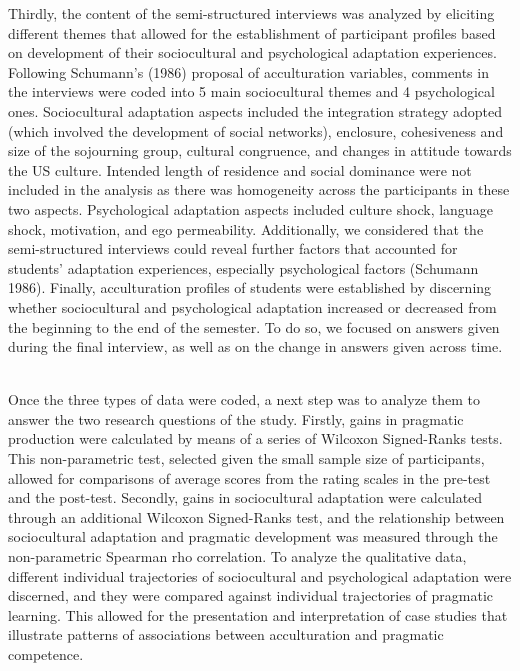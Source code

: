\documentclass[12pt]{article}
\newenvironment{styleStandard}{\setlength\leftskip{0cm}\setlength\rightskip{0cm plus 1fil}\setlength\parindent{0cm}\setlength\parfillskip{0pt plus 1fil}\setlength\parskip{0in plus 1pt}\writerlistparindent\writerlistleftskip\leavevmode\normalfont\normalsize\writerlistlabel\ignorespaces}{\unskip\vspace{0.111in plus 0.0111in}\par}
\newcommand\writerlistleftskip{}
\newcommand\writerlistparindent{}
\newcommand\writerlistlabel{}
\begin{document}
\begin{styleStandard}
Thirdly, the content of the semi-structured interviews was analyzed by eliciting different themes that allowed for the establishment of participant profiles based on development of their sociocultural and psychological adaptation experiences. Following Schumann’s (1986) proposal of acculturation variables, comments in the interviews were coded into 5 main sociocultural themes and 4 psychological ones. Sociocultural adaptation aspects included the integration strategy adopted (which involved the development of social networks), enclosure, cohesiveness and size of the sojourning group, cultural congruence, and changes in attitude towards the US culture. Intended length of residence and social dominance were not included in the analysis as there was homogeneity across the participants in these two aspects. Psychological adaptation aspects included culture shock, language shock, motivation, and ego permeability. Additionally, we considered that the semi-structured interviews could reveal further factors that accounted for students’ adaptation experiences, especially psychological factors (Schumann 1986). Finally, acculturation profiles of students were established by discerning whether sociocultural and psychological adaptation increased or decreased from the beginning to the end of the semester. To do so, we focused on answers given during the final interview, as well as on the change in answers given across time. \ 
\end{styleStandard}

\begin{styleStandard}
Once the three types of data were coded, a next step was to analyze them to answer the two research questions of the study. Firstly, gains in pragmatic production were calculated by means of a series of Wilcoxon Signed-Ranks tests. This non-parametric test, selected given the small sample size of participants, allowed for comparisons of average scores from the rating scales in the pre-test and the post-test. Secondly, gains in sociocultural adaptation were calculated through an additional Wilcoxon Signed-Ranks test, and the relationship between sociocultural adaptation and pragmatic development was measured through the non-parametric Spearman rho correlation. To analyze the qualitative data, different individual trajectories of sociocultural and psychological adaptation were discerned, and they were compared against individual trajectories of pragmatic learning. This allowed for the presentation and interpretation of case studies that illustrate patterns of associations between acculturation and pragmatic competence.
\end{styleStandard}
\end{document}
